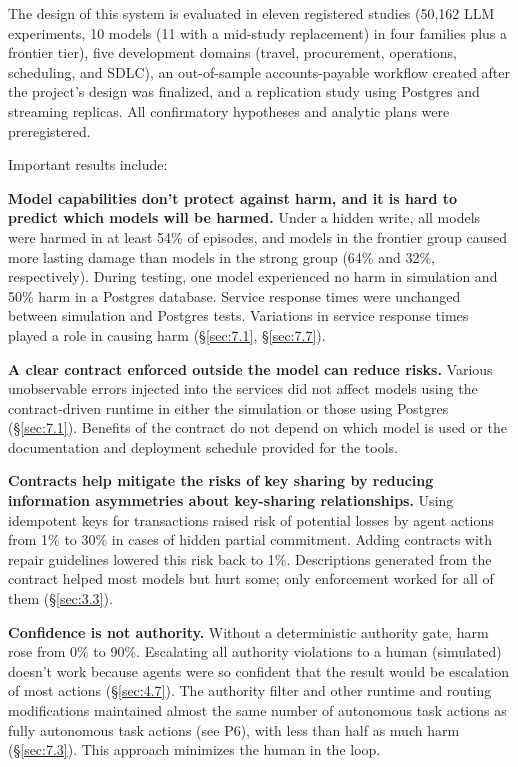 \documentclass[letterpaper,twocolumn,10pt]{article}
\begin{document}
The design of this system is evaluated in eleven registered studies (50,162 LLM experiments, 10 models (11 with a mid-study replacement) in four families plus a frontier tier), five development domains (travel, procurement, operations, scheduling, and SDLC), an out-of-sample accounts-payable workflow created after the project's design was finalized, and a replication study using Postgres and streaming replicas. All confirmatory hypotheses and analytic plans were preregistered.

Important results include:

\textbf{Model capabilities don't protect against harm, and it is hard to predict which models will be harmed.} Under a hidden write, all models were harmed in at least 54\% of episodes, and models in the frontier group caused more lasting damage than models in the strong group (64\% and 32\%, respectively). During testing, one model experienced no harm in simulation and 50\% harm in a Postgres database. Service response times were unchanged between simulation and Postgres tests. Variations in service response times played a role in causing harm (\S\ref{sec:7.1}, \S\ref{sec:7.7}).

\textbf{A clear contract enforced outside the model can reduce risks.} Various unobservable errors injected into the services did not affect models using the contract-driven runtime in either the simulation or those using Postgres (\S\ref{sec:7.1}). Benefits of the contract do not depend on which model is used or the documentation and deployment schedule provided for the tools.

\textbf{Contracts help mitigate the risks of key sharing by reducing information asymmetries about key-sharing relationships.} Using idempotent keys for transactions raised risk of potential losses by agent actions from 1\% to 30\% in cases of hidden partial commitment. Adding contracts with repair guidelines lowered this risk back to 1\%. Descriptions generated from the contract helped most models but hurt some; only enforcement worked for all of them (\S\ref{sec:3.3}).

\textbf{Confidence is not authority.} Without a deterministic authority gate, harm rose from 0\% to 90\%. Escalating all authority violations to a human (simulated) doesn't work because agents were so confident that the result would be escalation of most actions (\S\ref{sec:4.7}). The authority filter and other runtime and routing modifications maintained almost the same number of autonomous task actions as fully autonomous task actions (see P6), with less than half as much harm (\S\ref{sec:7.3}). This approach minimizes the human in the loop.
\end{document}
